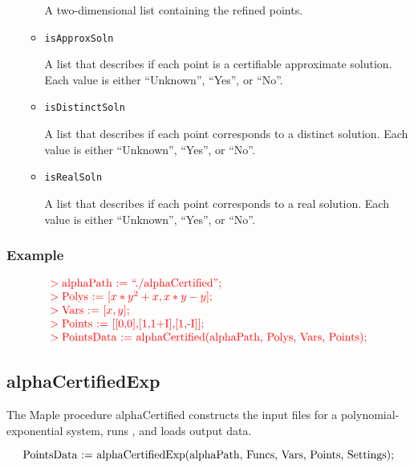 \documentclass[11pt]{report}
\begin{document}
\begin{itemize}
\begin{itemize}
A two-dimensional list containing the refined points.

 \item {\tt isApproxSoln}

A list that describes if each point is a certifiable approximate solution.
Each value is either ``Unknown'', ``Yes'', or ``No''.

 \item {\tt isDistinctSoln}

A list that describes if each point corresponds to a distinct solution.
Each value is either ``Unknown'', ``Yes'', or ``No''.

 \item {\tt isRealSoln}

A list that describes if each point corresponds to a real solution.
Each value is either ``Unknown'', ``Yes'', or ``No''.

\end{itemize}
\end{itemize}

\subsubsection{Example}

\[
\begin{color}{red}\begin{array}{l}
> \hbox{alphaPath := ``./alphaCertified'';} \\
> \hbox{Polys := [$x*y^2 + x, x*y - y$];} \\
> \hbox{Vars := [$x,y$];} \\
> \hbox{Points := [[0,0],[1,1+I],[1,-I]];} \\
> \hbox{PointsData := alphaCertified(alphaPath, Polys, Vars, Points);}
\end{array}\end{color}
\]

\subsection{alphaCertifiedExp}\label{Sec:alphaExpM}

The Maple procedure alphaCertified constructs the input files
for a polynomial-exponential system, runs \alphaCertified, and loads output data.

\[
\hbox{PointsData := alphaCertifiedExp(alphaPath, Funcs, Vars, Points, Settings);}
\]
\end{document}
